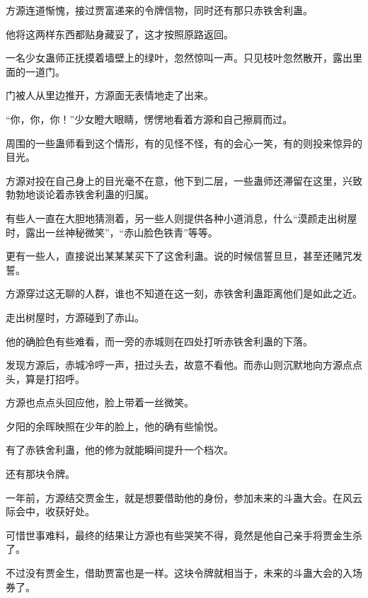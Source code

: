 \begin{this_body}
方源连道惭愧，接过贾富递来的令牌信物，同时还有那只赤铁舍利蛊。

他将这两样东西都贴身藏妥了，这才按照原路返回。

一名少女蛊师正抚摸着墙壁上的绿叶，忽然惊叫一声。只见枝叶忽然散开，露出里面的一道门。

门被人从里边推开，方源面无表情地走了出来。

“你，你，你！”少女瞪大眼睛，愣愣地看着方源和自己擦肩而过。

周围的一些蛊师看到这个情形，有的见怪不怪，有的会心一笑，有的则投来惊异的目光。

方源对投在自己身上的目光毫不在意，他下到二层，一些蛊师还滞留在这里，兴致勃勃地谈论着赤铁舍利蛊的归属。

有些人一直在大胆地猜测着，另一些人则提供各种小道消息，什么“漠颜走出树屋时，露出一丝神秘微笑”，“赤山脸色铁青”等等。

更有一些人，直接说出某某某买下了这舍利蛊。说的时候信誓旦旦，甚至还赌咒发誓。

方源穿过这无聊的人群，谁也不知道在这一刻，赤铁舍利蛊距离他们是如此之近。

走出树屋时，方源碰到了赤山。

他的确脸色有些难看，而一旁的赤城则在四处打听赤铁舍利蛊的下落。

发现方源后，赤城冷哼一声，扭过头去，故意不看他。而赤山则沉默地向方源点点头，算是打招呼。

方源也点点头回应他，脸上带着一丝微笑。

夕阳的余晖映照在少年的脸上，他的确有些愉悦。

有了赤铁舍利蛊，他的修为就能瞬间提升一个档次。

还有那块令牌。

一年前，方源结交贾金生，就是想要借助他的身份，参加未来的斗蛊大会。在风云际会中，收获好处。

可惜世事难料，最终的结果让方源也有些哭笑不得，竟然是他自己亲手将贾金生杀了。

不过没有贾金生，借助贾富也是一样。这块令牌就相当于，未来的斗蛊大会的入场券了。

\end{this_body}

